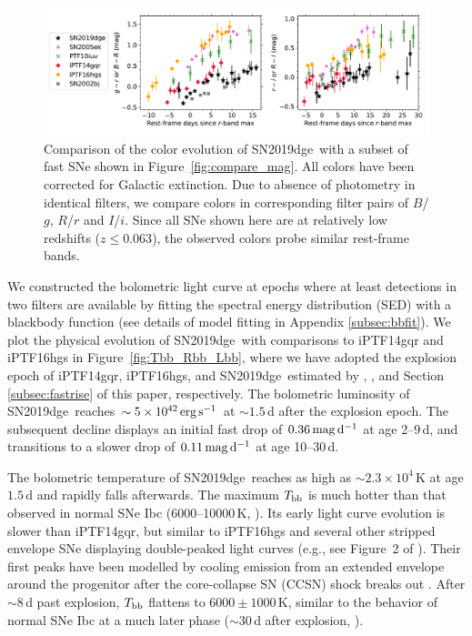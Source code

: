 \documentclass[twocolumn]{aastex63}
\newcommand{\name}{SN2019dge}
\begin{document}
\begin{figure}[htbp!]
	\centering
	\includegraphics[width=\textwidth]{figures/compare_color.pdf}
	\caption{Comparison of the color evolution of \name\ with a subset of fast SNe shown in 
		Figure~\ref{fig:compare_mag}. All colors have been corrected for Galactic extinction. Due to 
		absence of photometry in identical filters, we compare colors in corresponding filter pairs of 
		$B$/$g$, $R$/$r$ and $I$/$i$. Since all SNe shown here are at relatively low redshifts ($z\leq 
		0.063$), the observed colors probe similar rest-frame bands. \label{fig:compare_color}}
\end{figure}

We constructed the bolometric light curve at epochs where at least detections in two 
filters are available by fitting the spectral energy distribution (SED) with a blackbody function (see 
details of model fitting in Appendix \ref{subsec:bbfit}). We plot the physical evolution of \name\ 
with comparisons to iPTF14gqr and iPTF16hgs in Figure~\ref{fig:Tbb_Rbb_Lbb}, where we have 
adopted the explosion epoch of iPTF14gqr, iPTF16hgs, and \name\ estimated by \citet{De2018}, 
\citet{DeKC2018}, and Section \ref{subsec:fastrise} of this paper, respectively. The bolometric 
luminosity of \name\ reaches $\sim 5\times 10^{42}\,{\rm erg\, s^{-1}}$ 
at $\sim 1.5$\,d after the explosion epoch. The subsequent decline displays an initial 
fast drop of $0.36\,{\rm mag\,d^{-1}}$ at age 2--9\,d, and transitions to a slower drop of $0.11\,{\rm 
mag\,d^{-1}}$ at age 10--30\,d. 

The bolometric temperature of \name\ reaches as high as $\sim 2.3\times 10^4$\,K at age $1.5$\,d 
and rapidly falls afterwards. The maximum $T_{\rm bb}$ is much hotter than that observed in normal 
SNe Ibc (6000--10000\,K, \citealt{Taddia2018}). Its early light curve evolution is slower than iPTF14gqr, 
but similar to iPTF16hgs and several other stripped envelope SNe displaying double-peaked light curves 
(e.g., see Figure~2 of \citealt{Fremling2019}). Their first peaks have been modelled by cooling emission 
from an extended envelope around the progenitor after the core-collapse SN (CCSN) shock breaks out 
\citep{Modjaz2019}. After $\sim 8$\,d past explosion, $T_{\rm bb}$ flattens to $6000\pm1000$\,K, 
similar to the behavior of normal SNe Ibc at a much later phase ($\sim30$\,d after explosion, 
\citealt{Taddia2018}).
\end{document}
